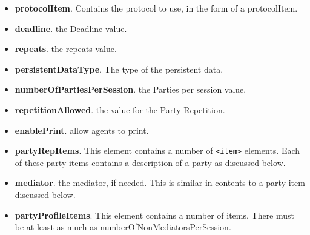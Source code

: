 \documentclass[]{llncs}
\begin{document}
\begin{itemize}
\item \textbf{protocolItem}. Contains the protocol to use, in the form of a protocolItem.
\item \textbf{deadline}.  the Deadline value.
\item \textbf{repeats}. the repeats value. 
\item \textbf{persistentDataType}. The type of the persistent data.
\item \textbf{numberOfPartiesPerSession}. the Parties per session value.
\item  \textbf{repetitionAllowed}. the value for the Party Repetition. 
\item  \textbf{enablePrint}. allow agents to print. 
\item \textbf{partyRepItems}. This element contains a number of \verb|<item>| elements. Each of these party items contains a description of a party as discussed below.
\item \textbf{mediator}. the mediator, if needed. This is similar in contents to a party item discussed below. 
 \item \textbf{partyProfileItems}. This element contains a number of items. There must be at least as much as numberOfNonMediatorsPerSession. 
 \end{itemize}
\end{document}
